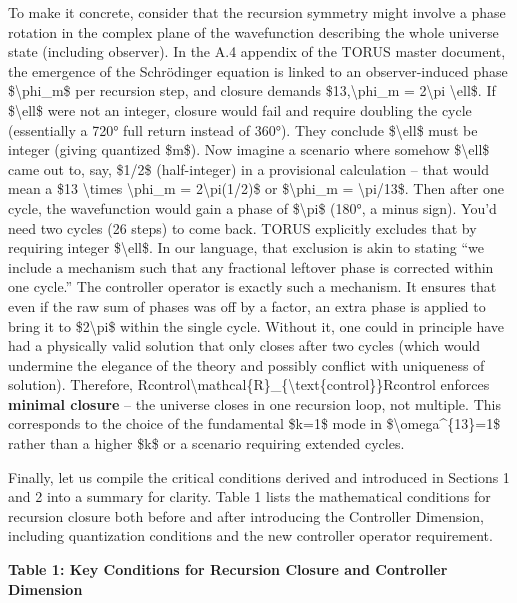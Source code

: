 \documentclass[]{article}
\begin{document}
To make it concrete, consider that the recursion symmetry might involve
a phase rotation in the complex plane of the wavefunction describing the
whole universe state (including observer). In the A.4 appendix of the
TORUS master document, the emergence of the Schrödinger equation is
linked to an observer-induced phase \$\textbackslash{}phi\_m\$ per
recursion step, and closure demands \$13,\textbackslash{}phi\_m =
2\textbackslash{}pi \textbackslash{}ell\$​. If \$\textbackslash{}ell\$
were not an integer, closure would fail and require doubling the cycle
(essentially a 720° full return instead of 360°)​. They conclude
\$\textbackslash{}ell\$ must be integer (giving quantized \$m\$)​. Now
imagine a scenario where somehow \$\textbackslash{}ell\$ came out to,
say, \$1/2\$ (half-integer) in a provisional calculation -- that would
mean a \$13 \textbackslash{}times \textbackslash{}phi\_m =
2\textbackslash{}pi(1/2)\$ or \$\textbackslash{}phi\_m =
\textbackslash{}pi/13\$. Then after one cycle, the wavefunction would
gain a phase of \$\textbackslash{}pi\$ (180°, a minus sign). You'd need
two cycles (26 steps) to come back. TORUS explicitly excludes that by
requiring integer \$\textbackslash{}ell\$​. In our language, that
exclusion is akin to stating ``we include a mechanism such that any
fractional leftover phase is corrected within one cycle.'' The
controller operator is exactly such a mechanism. It ensures that even if
the raw sum of phases was off by a factor, an extra phase is applied to
bring it to \$2\textbackslash{}pi\$ within the single cycle. Without it,
one could in principle have had a physically valid solution that only
closes after two cycles (which would undermine the elegance of the
theory and possibly conflict with uniqueness of solution). Therefore,
Rcontrol\textbackslash{}mathcal\{R\}\_\{\textbackslash{}text\{control\}\}Rcontrol​
enforces \textbf{minimal closure} -- the universe closes in one
recursion loop, not multiple. This corresponds to the choice of the
fundamental \$k=1\$ mode in \$\textbackslash{}omega\^{}\{13\}=1\$ rather
than a higher \$k\$ or a scenario requiring extended cycles​.

Finally, let us compile the critical conditions derived and introduced
in Sections 1 and 2 into a summary for clarity. Table 1 lists the
mathematical conditions for recursion closure both before and after
introducing the Controller Dimension, including quantization conditions
and the new controller operator requirement.

\textbf{Table 1: Key Conditions for Recursion Closure and Controller
Dimension}
\end{document}
